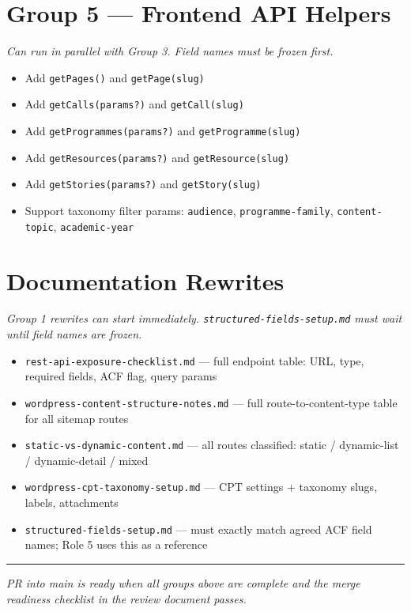 \documentclass[11pt,a4paper]{article}
\begin{document}
\section{Group 5 --- Frontend API Helpers}

\textit{Can run in parallel with Group 3. Field names must be frozen first.}

\begin{itemize}
    \item[$\square$] Add \texttt{getPages()} and \texttt{getPage(slug)}
    \item[$\square$] Add \texttt{getCalls(params?)} and \texttt{getCall(slug)}
    \item[$\square$] Add \texttt{getProgrammes(params?)} and \texttt{getProgramme(slug)}
    \item[$\square$] Add \texttt{getResources(params?)} and \texttt{getResource(slug)}
    \item[$\square$] Add \texttt{getStories(params?)} and \texttt{getStory(slug)}
    \item[$\square$] Support taxonomy filter params: \texttt{audience}, \texttt{programme-family}, \texttt{content-topic}, \texttt{academic-year}
\end{itemize}

\section{Documentation Rewrites}

\textit{Group 1 rewrites can start immediately. \texttt{structured-fields-setup.md} must wait until field names are frozen.}

\begin{itemize}
    \item[$\square$] \texttt{rest-api-exposure-checklist.md} --- full endpoint table: URL, type, required fields, ACF flag, query params
    \item[$\square$] \texttt{wordpress-content-structure-notes.md} --- full route-to-content-type table for all sitemap routes
    \item[$\square$] \texttt{static-vs-dynamic-content.md} --- all routes classified: static / dynamic-list / dynamic-detail / mixed
    \item[$\square$] \texttt{wordpress-cpt-taxonomy-setup.md} --- CPT settings + taxonomy slugs, labels, attachments
    \item[$\square$] \texttt{structured-fields-setup.md} --- must exactly match agreed ACF field names; Role 5 uses this as a reference
\end{itemize}

\vspace{1.2em}
\textcolor{uvtYellow}{\rule{\linewidth}{1.5pt}}
{\small\textit{PR into main is ready when all groups above are complete and the merge readiness checklist in the review document passes.}}
\end{document}
